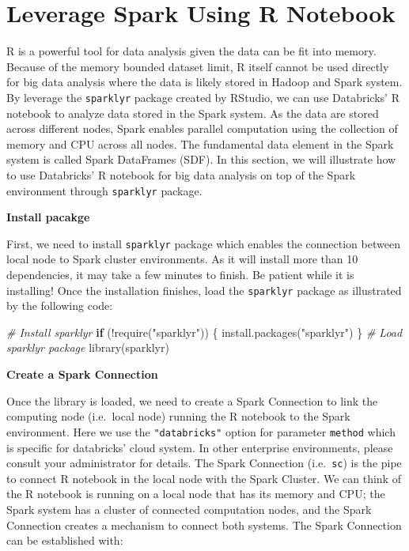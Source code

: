 \documentclass[
  12pt,
]{krantz}
\makeatletter
\newenvironment{Shaded}{\begin{snugshade}}{\end{snugshade}}
\newcommand{\CommentTok}[1]{\textcolor[rgb]{0.37,0.37,0.37}{\textit{#1}}}
\newcommand{\ControlFlowTok}[1]{\textcolor[rgb]{0.27,0.27,0.27}{\textbf{#1}}}
\newcommand{\FunctionTok}[1]{\textcolor[rgb]{0,0,0}{#1}}
\newcommand{\NormalTok}[1]{#1}
\newcommand{\SpecialCharTok}[1]{\textcolor[rgb]{0,0,0}{#1}}
\newcommand{\StringTok}[1]{\textcolor[rgb]{0.5,0.5,0.5}{#1}}
\newenvironment{kframe}{%
\medskip{}
\setlength{\fboxsep}{.8em}
 \def\at@end@of@kframe{}%
 \ifinner\ifhmode%
  \def\at@end@of@kframe{\end{minipage}}%
  \begin{minipage}{\columnwidth}%
 \fi\fi%
 \def\FrameCommand##1{\hskip\@totalleftmargin \hskip-\fboxsep
 \colorbox{shadecolor}{##1}\hskip-\fboxsep
     \hskip-\linewidth \hskip-\@totalleftmargin \hskip\columnwidth}%
 \MakeFramed {\advance\hsize-\width
   \@totalleftmargin\z@ \linewidth\hsize
   \@setminipage}}%
 {\par\unskip\endMakeFramed%
 \at@end@of@kframe}
\renewenvironment{Shaded}{\begin{kframe}}{\end{kframe}}
\makeatother
\begin{document}
\hypertarget{leveragesparkr}{%
\section{Leverage Spark Using R Notebook}\label{leveragesparkr}}

R is a powerful tool for data analysis given the data can be fit into memory. Because of the memory bounded dataset limit, R itself cannot be used directly for big data analysis where the data is likely stored in Hadoop and Spark system. By leverage the \texttt{sparklyr} package created by RStudio, we can use Databricks' R notebook to analyze data stored in the Spark system. As the data are stored across different nodes, Spark enables parallel computation using the collection of memory and CPU across all nodes. The fundamental data element in the Spark system is called Spark DataFrames (SDF). In this section, we will illustrate how to use Databricks' R notebook for big data analysis on top of the Spark environment through \texttt{sparklyr} package.

\textbf{Install pacakge}

First, we need to install \texttt{sparklyr} package which enables the connection between local node to Spark cluster environments. As it will install more than 10 dependencies, it may take a few minutes to finish. Be patient while it is installing! Once the installation finishes, load the \texttt{sparklyr} package as illustrated by the following code:

\begin{Shaded}
\begin{Highlighting}[]
\CommentTok{\# Install sparklyr}
\ControlFlowTok{if}\NormalTok{ (}\SpecialCharTok{!}\FunctionTok{require}\NormalTok{(}\StringTok{"sparklyr"}\NormalTok{)) \{}
\FunctionTok{install.packages}\NormalTok{(}\StringTok{"sparklyr"}\NormalTok{)}
\NormalTok{\}}
\CommentTok{\# Load sparklyr package}
\FunctionTok{library}\NormalTok{(sparklyr)}
\end{Highlighting}
\end{Shaded}

\textbf{Create a Spark Connection}

Once the library is loaded, we need to create a Spark Connection to link the computing node (i.e.~local node) running the R notebook to the Spark environment. Here we use the \texttt{"databricks"} option for parameter \texttt{method} which is specific for databricks' cloud system. In other enterprise environments, please consult your administrator for details. The Spark Connection (i.e.~\texttt{sc}) is the pipe to connect R notebook in the local node with the Spark Cluster. We can think of the R notebook is running on a local node that has its memory and CPU; the Spark system has a cluster of connected computation nodes, and the Spark Connection creates a mechanism to connect both systems. The Spark Connection can be established with:
\end{document}
